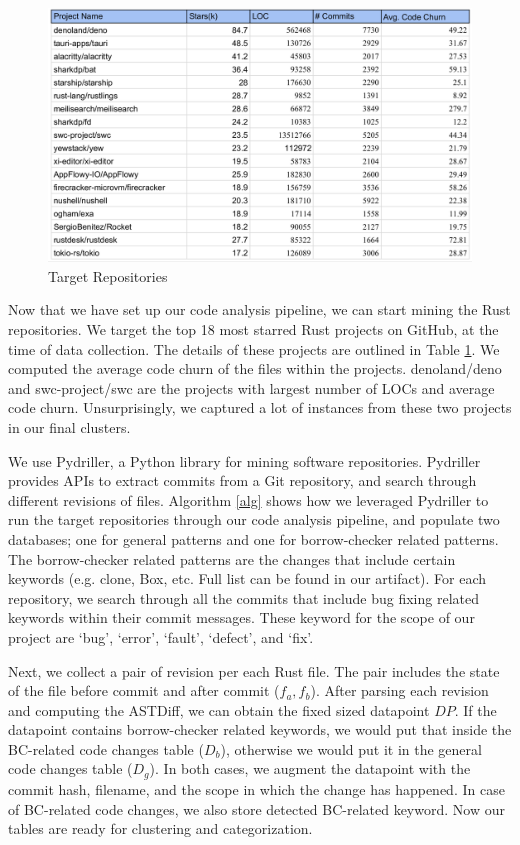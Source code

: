 \begin{figure}[h]
\centering
\includegraphics[width=1\textwidth]{figs/repos.png}
\caption{\label{table:repos} Target Repositories}
\end{figure}

Now that we have set up our code analysis pipeline, we can start mining the Rust repositories. We target the top 18 most starred Rust projects on GitHub, at the time of data collection. The details of these projects are outlined in Table \ref{table:repos}. We computed the average code churn of the files within the projects. denoland/deno and swc-project/swc are the projects with largest number of LOCs and average code churn. Unsurprisingly, we captured a lot of instances from these two projects in our final clusters.

We use Pydriller, a Python library for mining software repositories. Pydriller provides APIs to extract commits from a Git repository, and search through different revisions of files. Algorithm \ref{alg} shows how we leveraged Pydriller to run the target repositories through our code analysis pipeline, and populate two databases; one for general patterns and one for borrow-checker related patterns. The borrow-checker related patterns are the changes that include certain keywords (e.g. clone, Box, etc. Full list can be found in our artifact). For each repository, we search through all the commits that include bug fixing related keywords within their commit messages. These keyword for the scope of our project are `bug', `error', `fault', `defect', and `fix'. 

Next, we collect a pair of revision per each Rust file. The pair includes the state of the file before commit and after commit ($f_a, f_b$). After parsing each revision and computing the ASTDiff, we can obtain the fixed sized datapoint $DP$. If the datapoint contains borrow-checker related keywords, we would put that inside the BC-related code changes table ($D_b$), otherwise we would put it in the general code changes table ($D_g$). In both cases, we augment the datapoint with the commit hash, filename, and the scope in which the change has happened. In case of BC-related code changes, we also store detected BC-related keyword. Now our tables are ready for clustering and categorization.

